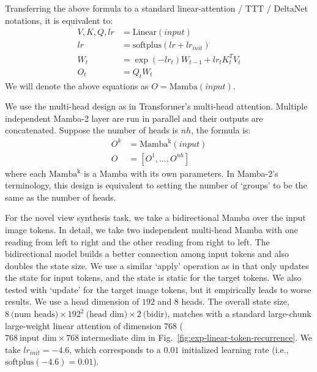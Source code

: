 Transferring the above formula to a standard linear-attention / TTT / DeltaNet notations, it is equivalent to:
\begin{align}
    V, K, Q, \mathit{lr} & = \mathrm{Linear}(\mathit{input}) \nonumber \\
    \mathit{lr} & = \mathrm{softplus}(\mathit{lr} + \mathit{lr}_\mathit{init}) \nonumber \\
    W_t &= \exp(-\mathit{lr}_t) W_{t-1} + \mathit{lr}_t K_t^T V_t   \nonumber \\
    O_t &= Q_t W_t 
    \label{eqn:mamba2}
\end{align}
We will denote the above equations as $O = \mathrm{Mamba}(\mathit{input})$.

We use the multi-head design as in Transformer's multi-head attention.
Multiple independent Mamba-2 layer are run in parallel and their outputs are concatenated.
Suppose the number of heads is $\mathit{nh}$, the formula is:
\begin{align}
    O^k & = \mathrm{Mamba^k} (\mathit{input}) \nonumber \\
    O &= [O^1, \ldots, O^\mathit{nh}]
\end{align}
where each $\mathrm{Mamba^k}$ is a Mamba with its own parameters.
In Mamba-2's terminology, this design is equivalent to setting the number of `groups' to be the same as the number of heads.

For the novel view synthesis task, we take a bidirectional Mamba over the input image tokens.
In detail, we take two independent multi-head Mamba with one reading from left to right and the other reading from right to left.
The bidirectional model builds a better connection among input tokens and also doubles the state size.
We use a similar `apply' operation as in \methodname{} that only updates the state for input tokens, and the state is static for the target tokens.
We also tested with `update' for the target image tokens, but it empirically leads to worse results.
We use a head dimension of $192$ and $8$ heads.
The overall state size, $8~\text{(num heads)} \times 192^{2} ~\text{(head dim)} \times 2~\text{(bidir)}$, matches \methodname{} with a standard large-chunk large-weight linear attention of dimension $768$ ($768~\text{input dim} \times 768~\text{intermediate dim}$ in Fig.~\ref{fig:exp-linear-token-recurrence}.
We take $\mathit{lr}_\mathit{init}{=}-4.6$, which corresponds to a $0.01$ initialized learning rate (i.e., $\mathrm{softplus}(-4.6) = 0.01$).

